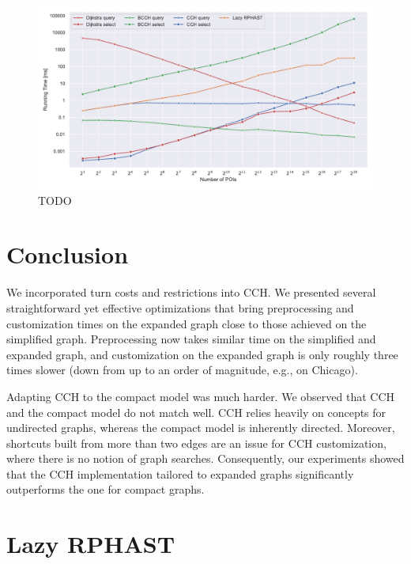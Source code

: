 \documentclass[a4paper, english, cleveref]{lipics-v2021}
\begin{document}
\begin{figure}
\centering
\includegraphics[width=\linewidth]{fig/knn.pdf}
\caption{
TODO
}\label{fig:knn}
\end{figure}

\section{Conclusion}
\label{sec:conclusion}

We incorporated turn costs and restrictions into CCH. We presented several straightforward yet effective optimizations that bring preprocessing and customization times on the expanded graph close to those achieved on the simplified graph. Preprocessing now takes similar time on the simplified and expanded graph, and customization on the expanded graph is only roughly three times slower (down from up to an order of magnitude, e.g., on Chicago).

Adapting CCH to the compact model was much harder. We observed that CCH and the compact model do not match well. CCH relies heavily on concepts for undirected graphs, whereas the compact model is inherently directed. Moreover, shortcuts built from more than two edges are an issue for CCH customization, where there is no notion of graph searches. Consequently, our experiments showed that the CCH implementation tailored to expanded graphs significantly outperforms the one for compact graphs.



\appendix

\section{Lazy RPHAST}
\end{document}
